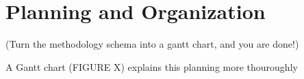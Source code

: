 \newpage
\section{Planning and Organization}

(Turn the methodology schema into a gantt chart, and you are done!)


A Gantt chart (FIGURE X) explains this planning more thouroughly